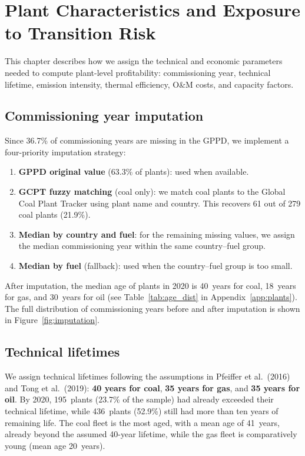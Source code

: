 \documentclass[a4paper, 12pt]{report}
\numberwithin{equation}{chapter}
\numberwithin{figure}{chapter}
\numberwithin{table}{chapter}
\begin{document}
\chapter{Plant Characteristics and Exposure to Transition Risk}
\label{ch:plants}

This chapter describes how we assign the technical and economic parameters needed to compute plant-level profitability: commissioning year, technical lifetime, emission intensity, thermal efficiency, O\&M costs, and capacity factors.

\section{Commissioning year imputation}
\label{sec:imputation}

Since 36.7\% of commissioning years are missing in the GPPD, we implement a four-priority imputation strategy:

\begin{enumerate}[nosep]
    \item \textbf{GPPD original value} (63.3\% of plants): used when available.
    \item \textbf{GCPT fuzzy matching} (coal only): we match coal plants to the Global Coal Plant Tracker using plant name and country. This recovers 61 out of 279 coal plants (21.9\%).
    \item \textbf{Median by country and fuel}: for the remaining missing values, we assign the median commissioning year within the same country--fuel group.
    \item \textbf{Median by fuel} (fallback): used when the country--fuel group is too small.
\end{enumerate}

\vspace{0.1cm}
After imputation, the median age of plants in 2020 is 40~years for coal, 18~years for gas, and 30~years for oil (see Table~\ref{tab:age_dist} in Appendix~\ref{app:plants}). The full distribution of commissioning years before and after imputation is shown in Figure~\ref{fig:imputation}.


\section{Technical lifetimes}

We assign technical lifetimes following the assumptions in Pfeiffer et al.\ (2016) and Tong et al.\ (2019): \textbf{40 years for coal}, \textbf{35 years for gas}, and \textbf{35 years for oil}. 
By 2020, 195~plants (23.7\% of the sample) had already exceeded their technical lifetime, while 436~plants (52.9\%) still had more than ten years of remaining life. The coal fleet is the most aged, with a mean age of 41~years, already beyond the assumed 40-year lifetime, while the gas fleet is comparatively young (mean age 20~years).
\end{document}
